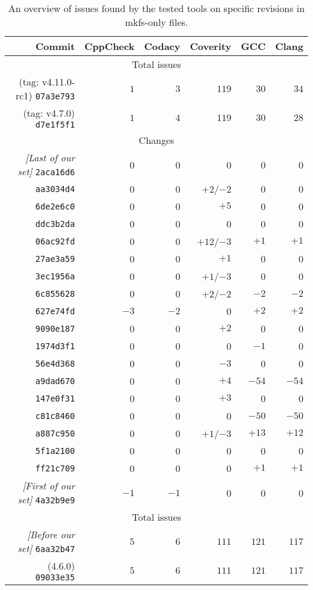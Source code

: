 \begin{table}[h]
\begin{tabular}{|r||r|r|r|r|r|}
\hline
Commit & CppCheck & Codacy  & Coverity & GCC & Clang \\
\hline
\hline
\multicolumn{6}{|c|}{Total issues}\\
\hline
(tag: v4.11.0-rc1) {\tt 07a3e793} & $1$ & $3$ & $119$ & $30$ & $34$ \\
\hline
(tag: v4.7.0) {\tt d7e1f5f1} & $1$ & $4$ & $119$ & $30$ & $28$ \\
\hline
\hline
\multicolumn{6}{|c|}{Changes}\\
\hline
{\em [Last of our set]} {\tt 2aca16d6} & 0 & 0 & 0 & 0 & 0 \\
\hline
{\tt aa3034d4} & 0 & 0 & $+2$/$-2$ & 0 & 0 \\
\hline
{\tt 6de2e6c0} & 0 & 0 & $+5$ & 0 & 0 \\
\hline
{\tt ddc3b2da} & 0 & 0 & 0 & 0 & 0\\
\hline
{\tt 06ac92fd} & 0 & 0 & $+12$/$-3$ & $+1$ & $+1$\\
\hline
{\tt 27ae3a59} & 0 & 0 & $+1$ & 0 & 0 \\
\hline
{\tt 3ec1956a} & 0 & 0 & $+1$/$-3$ & 0 & 0 \\
\hline
{\tt 6c855628} & 0 & 0 & $+2$/$-2$ & $-2$ & $-2$ \\
\hline
{\tt 627e74fd} & $-3$ & $-2$ & 0 & $+2$ & $+2$ \\
\hline
{\tt 9090e187} & 0 & 0 & $+2$ & 0 & 0 \\
\hline
{\tt 1974d3f1} & 0 & 0 & 0 & $-1$ & 0 \\
\hline
{\tt 56e4d368} & 0 & 0 & $-3$ & 0 & 0 \\
\hline
{\tt a9dad670} & 0 & 0 & $+4$ & $-54$ & $-54$ \\
\hline
{\tt 147e0f31} & 0 & 0 & $+3$ & 0 & 0 \\
\hline
{\tt c81c8460} & 0 & 0 & 0 & $-50$ & $-50$ \\
\hline
{\tt a887c950} & 0 & 0 & $+1$/$-3$ & $+13$ & $+12$ \\
\hline
{\tt 5f1a2100} & 0 & 0 & 0 & 0 & 0 \\
\hline
{\tt ff21c709} & 0 & 0 & 0 & $+1$ & $+1$ \\
\hline
{\em [First of our set]} {\tt 4a32b9e9} & $-1$ & $-1$ & 0 & 0 & 0 \\
\hline
\hline
\multicolumn{6}{|c|}{Total issues} \\
\hline
{\em [Before our set]} {\tt 6aa32b47} & $5$ & $6$ & $111$ & $121$ & $117$ \\
\hline
(4.6.0) {\tt 09033e35} & $5$ & $6$ & $111$ & $121$ & $117$ \\
\hline
\end{tabular}
\caption{An overview of issues found by the tested tools on specific revisions
	in mkfs-only files.}
\label{tab:results:overview}
\end{table}

